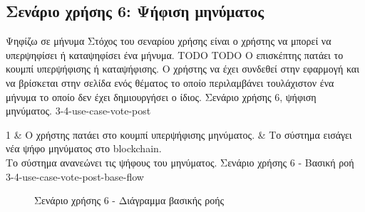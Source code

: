 \subsection{Σενάριο χρήσης 6: Ψήφιση μηνύματος} \label{subsection:3-4-use-case-vote-post}

\useCaseTable
{Ψηφίζω σε μήνυμα}
{Στόχος του σεναρίου χρήσης είναι ο χρήστης να μπορεί να υπερψηφίσει ή καταψηφίσει ένα μήνυμα.}
{TODO}
{TODO}
{Ο επισκέπτης πατάει το κουμπί υπερψήφισης ή καταψήφισης.}
{Ο χρήστης να έχει συνδεθεί στην εφαρμογή και να βρίσκεται στην σελίδα ενός θέματος το οποίο περιλαμβάνει τουλάχιστον ένα μήνυμα το οποίο δεν έχει δημιουργήσει ο ίδιος.}
{Σενάριο χρήσης 6, ψήφιση μηνύματος.}
{3-4-use-case-vote-post}

\useCaseBaseFlowTable
{
    1 & Ο χρήστης πατάει στο κουμπί υπερψήφισης μηνύματος. & Το σύστημα εισάγει νέα ψήφο μηνύματος στο blockchain. \\ [0.5ex]
}
{Το σύστημα ανανεώνει τις ψήφους του μηνύματος.}
{Σενάριο χρήσης 6 - Βασική ροή}
{3-4-use-case-vote-post-base-flow}

\begin{figure}[H]
    \centering
    
    \caption{Σενάριο χρήσης 6 - Διάγραμμα βασικής ροής}
    \label{figure:3-4-use-case-vote-post-base-flow-sequence-diagram}
\end{figure}
